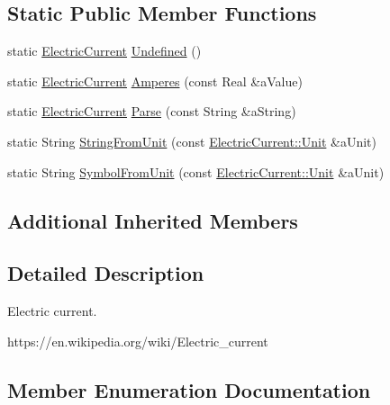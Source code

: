 \subsection*{Static Public Member Functions}
\begin{DoxyCompactItemize}
\item 
static \hyperlink{classostk_1_1physics_1_1units_1_1_electric_current}{Electric\+Current} \hyperlink{classostk_1_1physics_1_1units_1_1_electric_current_a1677d42ac10b4fa38624b865f8e097ff}{Undefined} ()
\item 
static \hyperlink{classostk_1_1physics_1_1units_1_1_electric_current}{Electric\+Current} \hyperlink{classostk_1_1physics_1_1units_1_1_electric_current_aea20319b4f2f5e3a312af69baa3bd657}{Amperes} (const Real \&a\+Value)
\item 
static \hyperlink{classostk_1_1physics_1_1units_1_1_electric_current}{Electric\+Current} \hyperlink{classostk_1_1physics_1_1units_1_1_electric_current_ae7e0f9395409e3591e31acb853e846db}{Parse} (const String \&a\+String)
\item 
static String \hyperlink{classostk_1_1physics_1_1units_1_1_electric_current_a89a2bfd34bd35db99c381a27fe969e5c}{String\+From\+Unit} (const \hyperlink{classostk_1_1physics_1_1units_1_1_electric_current_ac57c87a7533dc73b87185b0d9ae6985b}{Electric\+Current\+::\+Unit} \&a\+Unit)
\item 
static String \hyperlink{classostk_1_1physics_1_1units_1_1_electric_current_a3e1d115ee8e8eb80ec72dab5dea37ad1}{Symbol\+From\+Unit} (const \hyperlink{classostk_1_1physics_1_1units_1_1_electric_current_ac57c87a7533dc73b87185b0d9ae6985b}{Electric\+Current\+::\+Unit} \&a\+Unit)
\end{DoxyCompactItemize}
\subsection*{Additional Inherited Members}


\subsection{Detailed Description}
Electric current. 

https\+://en.wikipedia.\+org/wiki/\+Electric\+\_\+current 

\subsection{Member Enumeration Documentation}
\mbox{\label{classostk_1_1physics_1_1units_1_1_electric_current_ac57c87a7533dc73b87185b0d9ae6985b}} 
